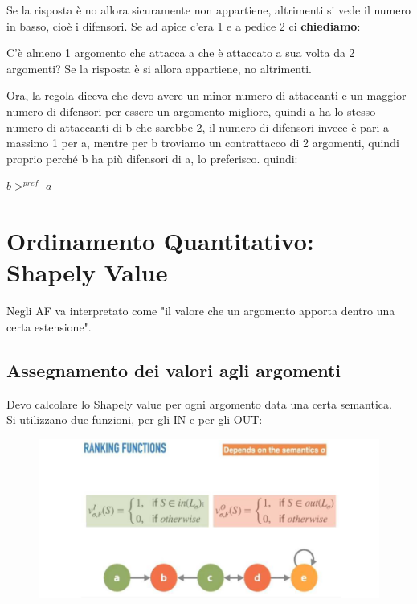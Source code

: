     \noindent Se la risposta è no allora sicuramente non appartiene, altrimenti
    si vede il numero in basso, cioè i difensori.
    \vspace{0.3cm}
    \noindent Se ad apice c'era 1 e a pedice 2 ci \textbf{chiediamo}:

    \vspace{0.3cm}

    \noindent C'è almeno 1 argomento che attacca a che è attaccato a sua volta
    da 2 argomenti? Se la risposta è si allora appartiene, no altrimenti.

    \vspace{0.3cm}

    \noindent Ora, la regola diceva che devo avere un minor numero di attaccanti
    e un maggior numero di difensori per essere un argomento migliore, quindi a
    ha lo stesso numero di attaccanti di b che sarebbe 2, il numero di difensori
    invece è pari a massimo 1 per a, mentre per b troviamo un contrattacco di 2
    argomenti, quindi proprio perché b ha più difensori di a, lo preferisco.
    quindi:
    \begin{center}
        $b >^{pref}$ $a$
    \end{center}
    \section{Ordinamento Quantitativo: Shapely Value}
    Negli AF va interpretato come "il valore che un argomento apporta dentro una
    certa estensione".
    \subsection{Assegnamento dei valori agli argomenti}
    Devo calcolare lo Shapely value per ogni argomento data una certa semantica.
    \\
    Si utilizzano due funzioni, per gli IN e per gli OUT:
    \begin{figure}[htp]
        \centering
        \includegraphics[width=13cm, keepaspectratio]{img/Cap8/ordinamento-quantitativo.png}
    \end{figure}

